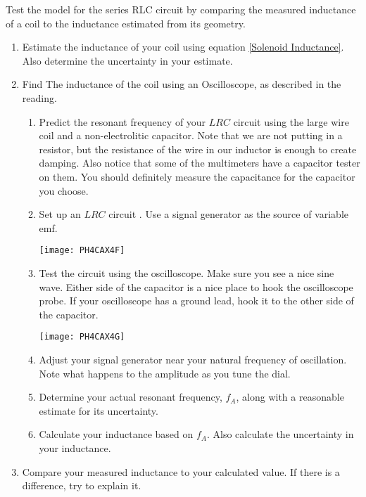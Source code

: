 \activity
{
Test the model for the series RLC circuit by comparing the measured inductance
of a coil to the inductance estimated from its geometry.
\begin{enumerate}
\item Estimate the inductance of your coil using equation \ref{Solenoid
Inductance}. Also determine the uncertainty in your estimate.

\item Find The inductance of the coil using an Oscilloscope, as described in
	the reading.

\begin{enumerate}
\item Predict the resonant frequency of your $LRC$ circuit using the large
wire coil and a non-electrolitic capacitor. Note that we
are not putting in a resistor, but the resistance of the wire in our inductor is
enough to create damping. Also notice that some of the multimeters have a
capacitor tester on them. You should definitely measure the capacitance for the
capacitor you choose.

\item Set up an $LRC$ circuit . 
Use a signal
generator as the source of variable emf. 
\begin{center}
\texttt{[image: PH4CAX4F]}
\end{center}

\item Test the circuit using the oscilloscope. Make sure you see a nice sine
wave. Either side of the capacitor is a nice place to hook the oscilloscope
probe. If your oscilloscope has a ground lead, hook it to the other side of
the capacitor.
\begin{center}
\texttt{[image: PH4CAX4G]}
\end{center}

\item Adjust your signal generator near your natural frequency of
oscillation. Note what happens to the amplitude as you tune the dial.

\item Determine your actual resonant frequency, $f_{A}$, along with a 
	reasonable estimate for its uncertainty.

\item Calculate your inductance based on $f_{A}$. Also calculate the uncertainty
	in your inductance.
\end{enumerate}
\item Compare your measured inductance to your calculated
value. If there is a difference, try to explain it.
\end{enumerate}
}
\vfill%
